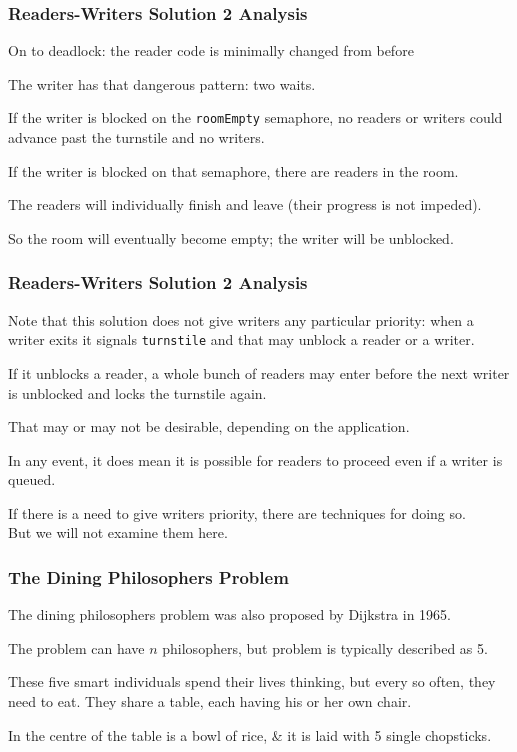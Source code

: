 \begin{frame}
\frametitle{Readers-Writers Solution 2 Analysis}

On to deadlock: the reader code is minimally changed from before 

The writer has that dangerous pattern: two waits. 

If the writer is blocked on the \texttt{roomEmpty} semaphore, no readers or writers could advance past the turnstile and no writers. 

If the writer is blocked on that semaphore, there are readers in the room. 

The readers will individually finish and leave (their progress is not impeded). 

So the room will eventually become empty; the writer will be unblocked.


\end{frame}

\begin{frame}
\frametitle{Readers-Writers Solution 2 Analysis}

Note that this solution does not give writers any particular priority: when a writer exits it signals \texttt{turnstile} and that may unblock a reader or a writer. 

If it unblocks a reader, a whole bunch of readers may enter before the next writer is unblocked and locks the turnstile again. 

That may or may not be desirable, depending on the application. 

In any event, it does mean it is possible for readers to proceed even if a writer is queued. 

If there is a need to give writers priority, there are techniques for doing so.\\
\quad But we will not examine them here.

\end{frame}

\begin{frame}
\frametitle{The Dining Philosophers Problem}

The dining philosophers problem was also proposed by Dijkstra in 1965. 

The problem can have $n$ philosophers, but problem is typically described as 5. 

 These five smart individuals spend their lives thinking, but every so often, they need to eat. They share a table, each having his or her own chair. 
 
In the centre of the table is a bowl of rice, \& it is laid with 5 single chopsticks. 

\end{frame}


